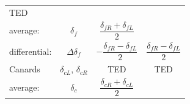\documentclass[
]{book}
\begin{document}
\begin{longtable}[]{@{}lccc@{}}
\begin{minipage}[t]{0.27\columnwidth}
TED\strut
\end{minipage}\tabularnewline
\begin{minipage}[t]{0.19\columnwidth}\raggedright
average:\strut
\end{minipage} & \begin{minipage}[t]{0.14\columnwidth}\centering
\(\delta_f\)\strut
\end{minipage} & \begin{minipage}[t]{0.29\columnwidth}\centering
\[\frac{\delta_{fR} + \delta_{fL}}{2}\]\strut
\end{minipage} & \begin{minipage}[t]{0.27\columnwidth}\centering
\strut
\end{minipage}\tabularnewline
\begin{minipage}[t]{0.19\columnwidth}\raggedright
differential:\strut
\end{minipage} & \begin{minipage}[t]{0.14\columnwidth}\centering
\(\Delta\delta_f\)\strut
\end{minipage} & \begin{minipage}[t]{0.29\columnwidth}\centering
\[-\frac{\delta_{fR} - \delta_{fL}}{2}\]\strut
\end{minipage} & \begin{minipage}[t]{0.27\columnwidth}\centering
\[\frac{\delta_{fR} - \delta_{fL}}{2}\]\strut
\end{minipage}\tabularnewline
\begin{minipage}[t]{0.19\columnwidth}\raggedright
Canards\strut
\end{minipage} & \begin{minipage}[t]{0.14\columnwidth}\centering
\(\delta_{cL}\),
\(\delta_{cR}\)\strut
\end{minipage} & \begin{minipage}[t]{0.29\columnwidth}\centering
TED\strut
\end{minipage} & \begin{minipage}[t]{0.27\columnwidth}\centering
TED\strut
\end{minipage}\tabularnewline
\begin{minipage}[t]{0.19\columnwidth}\raggedright
average:\strut
\end{minipage} & \begin{minipage}[t]{0.14\columnwidth}\centering
\(\delta_c\)\strut
\end{minipage} & \begin{minipage}[t]{0.29\columnwidth}\centering
\[\frac{\delta_{cR} + \delta_{cL}}{2}\]\strut

\end{minipage}
\end{longtable}
\end{document}
